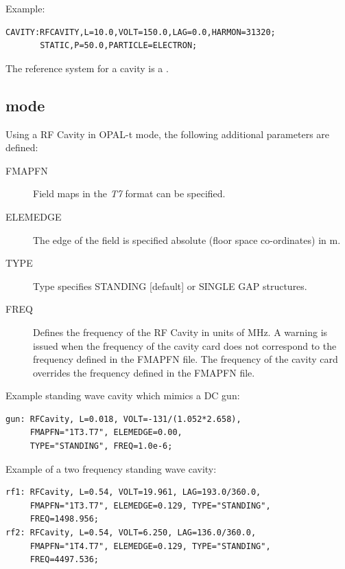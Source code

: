 \noindent Example:
\begin{verbatim}
CAVITY:RFCAVITY,L=10.0,VOLT=150.0,LAG=0.0,HARMON=31320;
       STATIC,P=50.0,PARTICLE=ELECTRON;
\end{verbatim}
The reference system for a cavity is a 
.

\subsection{\opalt mode}
\label{sec:cavity-t}
Using a RF Cavity in OPAL-t mode, the following additional parameters are defined:
\begin{description}
\item[FMAPFN]
  Field maps in the {\em T7} format can be specified.
\item[ELEMEDGE]
  The edge of the field is specified absolute (floor space co-ordinates) in m.
  \item[TYPE]
  Type specifies STANDING [default] or SINGLE GAP structures.   
  \item[FREQ]
  Defines the frequency of the RF Cavity in units of MHz. A warning is issued when the frequency of
  the cavity card does not correspond to the frequency defined in the   FMAPFN file. The  frequency of
  the cavity card overrides the  frequency defined in the  FMAPFN file.
  \end{description}
\noindent Example standing wave cavity which mimics a DC gun:
\begin{verbatim}
gun: RFCavity, L=0.018, VOLT=-131/(1.052*2.658), 
     FMAPFN="1T3.T7", ELEMEDGE=0.00, 
     TYPE="STANDING", FREQ=1.0e-6;
\end{verbatim}
\noindent Example of a two frequency standing wave cavity:
\begin{verbatim}
rf1: RFCavity, L=0.54, VOLT=19.961, LAG=193.0/360.0,
     FMAPFN="1T3.T7", ELEMEDGE=0.129, TYPE="STANDING", 
     FREQ=1498.956;
rf2: RFCavity, L=0.54, VOLT=6.250, LAG=136.0/360.0,
     FMAPFN="1T4.T7", ELEMEDGE=0.129, TYPE="STANDING", 
     FREQ=4497.536;
\end{verbatim}

